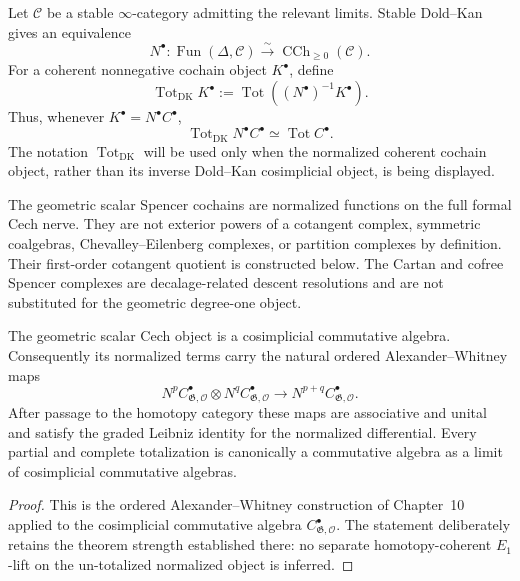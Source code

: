 \begin{definition}
\label{def:as-dk-totalization}
Let $\mathcal C$ be a stable $\infty$-category admitting the relevant limits.
Stable Dold--Kan gives an equivalence
\[
    N^\bullet:
    \operatorname{Fun}(\Delta,\mathcal C)
    \xrightarrow{\sim}
    \operatorname{CCh}_{\geq0}(\mathcal C).
\]
For a coherent nonnegative cochain object $K^\bullet$, define
\[
\boxed{
    \operatorname{Tot}_{\mathrm{DK}}K^\bullet
    :=
    \operatorname{Tot}
    \left(
        (N^\bullet)^{-1}K^\bullet
    \right).
}
\]
Thus, whenever $K^\bullet=N^\bullet C^\bullet$,
\[
\boxed{
    \operatorname{Tot}_{\mathrm{DK}}N^\bullet C^\bullet
    \simeq
    \operatorname{Tot}C^\bullet.
}
\]
The notation $\operatorname{Tot}_{\mathrm{DK}}$ will be used only when the
normalized coherent cochain object, rather than its inverse Dold--Kan
cosimplicial object, is being displayed.
\end{definition}

\begin{remark}
The geometric scalar Spencer cochains are normalized functions on the full
formal Cech nerve.  They are not exterior powers of a cotangent complex,
symmetric coalgebras, Chevalley--Eilenberg complexes, or partition complexes
by definition.  Their first-order cotangent quotient is constructed below.
The Cartan and cofree Spencer complexes are decalage-related descent
resolutions and are not substituted for the geometric degree-one object.
\end{remark}

\begin{proposition}
\label{prop:as-spencer-multiplicative}
The geometric scalar Cech object is a cosimplicial commutative algebra.
Consequently its normalized terms carry the natural ordered
Alexander--Whitney maps
\[
    N^pC_{\mathfrak G,\mathcal O}^{\bullet}
    \otimes
    N^qC_{\mathfrak G,\mathcal O}^{\bullet}
    \longrightarrow
    N^{p+q}C_{\mathfrak G,\mathcal O}^{\bullet}.
\]
After passage to the homotopy category these maps are associative and unital
and satisfy the graded Leibniz identity for the normalized differential.
Every partial and complete totalization is canonically a commutative algebra
as a limit of cosimplicial commutative algebras.
\end{proposition}

\begin{proof}
This is the ordered Alexander--Whitney construction of Chapter~10 applied to
the cosimplicial commutative algebra
$C_{\mathfrak G,\mathcal O}^{\bullet}$.  The statement deliberately retains
the theorem strength established there: no separate homotopy-coherent
$E_1$-lift on the un-totalized normalized object is inferred.
\end{proof}

